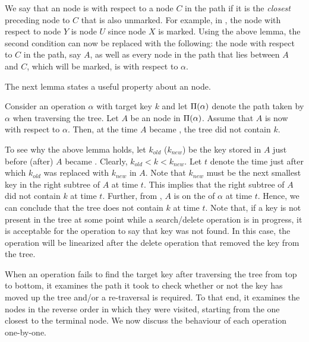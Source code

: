 We say that an \myanchor{} node is \emph{\mycritical{}} with respect to a node $C$ in the path if it is the \emph{closest} preceding \myanchor{} node to $C$ that is also unmarked. For example, in , the \mycritical{} \myanchor{} node with respect to node $Y$ is node $U$ since node $X$ is marked. Using the above lemma, the second condition can now be replaced with the following: the \mycritical{} \myanchor{} node with respect to $C$ in the path, say $A$, as well as every \myanchor{} node in the path that lies between $A$ and $C$, which will be marked, is \myconsistent{} with respect to $\alpha$.

The next lemma states a useful  property about an \myinconsistent{} \myanchor{} node.

\begin{lemma}
\label{lem:inconsistent}
Consider an operation $\alpha$ with target key $k$ and let $\Pi(\alpha)$ denote the path 
taken by $\alpha$ when traversing the tree. Let $A$ be an \myanchor{} node in $\Pi(\alpha)$. Assume that $A$ is now \myinconsistent{} with respect to $\alpha$. Then, at the time $A$ became \myinconsistent{}, the tree did not contain $k$.
\end{lemma}

To see why the above lemma holds, let $k_{old}$ ($k_{new}$) be the key stored in $A$ just before (after) $A$ became \myinconsistent{}. Clearly, $k_{old} < k < k_{new}$. Let $t$ denote the time just after which $k_{old}$ was replaced with $k_{new}$ in $A$. Note that $k_{new}$ must be the next smallest key in the right subtree of $A$ at time $t$. This implies that the right subtree of $A$ did not contain $k$ at time $t$. Further, from , $A$ is on the \accesspath of $\alpha$ at time $t$. Hence, we can conclude that the tree does not contain $k$ at time $t$. Note that, if a key is not present in the tree at some point while a search/delete operation is in progress, it is acceptable for the operation to say that key was not found. In this case, the operation will be linearized after the delete operation that removed the key from the tree.

When an operation fails to find the target key after traversing the tree from top to bottom, it examines the path it took to check whether or not the key has moved up the tree and/or a re-traversal is required. To that end, it examines the \myanchor{} nodes in the reverse order in which they were visited, starting from the one closest to the terminal node. We now discuss the behaviour of each operation one-by-one.


